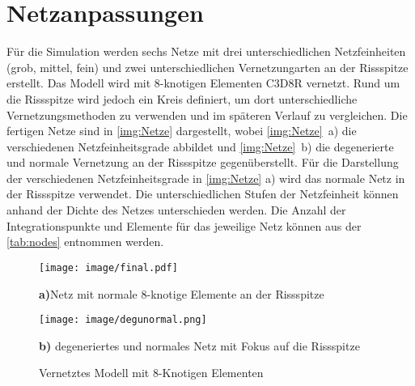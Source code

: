 \section{Netzanpassungen} %

Für die Simulation werden sechs Netze mit drei unterschiedlichen Netzfeinheiten (grob, mittel, fein) und zwei unterschiedlichen Vernetzungarten an der Rissspitze erstellt.  Das Modell wird mit 8-knotigen Elementen \glqq C3D8R\grqq{} vernetzt. Rund um die Rissspitze wird jedoch ein Kreis definiert, um dort unterschiedliche Vernetzungsmethoden zu verwenden und im späteren Verlauf zu vergleichen.  Die fertigen Netze sind in \autoref{img:Netze} dargestellt, wobei \autoref{img:Netze}~a) die verschiedenen Netzfeinheitsgrade abbildet und \autoref{img:Netze}~b) die degenerierte und normale Vernetzung an der Rissspitze gegenüberstellt. Für die Darstellung der verschiedenen Netzfeinheitsgrade in \autoref{img:Netze} a) wird das normale Netz in der Rissspitze verwendet. Die unterschiedlichen Stufen der Netzfeinheit können anhand der Dichte des Netzes unterschieden werden. Die Anzahl der Integrationspunkte und Elemente für das jeweilige Netz können aus der \autoref{tab:nodes} entnommen werden.

\begin{figure}[h]
   \begin{minipage}[b]{.5043\linewidth} %
      \texttt{[image: image/final.pdf]}
      \caption*{\textbf{a)}Netz mit normale 8-knotige Elemente an der Rissspitze}
   \end{minipage}
   \hspace{.01\linewidth}%
   \begin{minipage}[b]{.37\linewidth} %
      \texttt{[image: image/degunormal.png]}
      \caption*{\textbf{b)} degeneriertes und normales Netz mit Fokus auf die Rissspitze}
   \end{minipage}
   \caption{Vernetztes Modell mit 8-Knotigen Elementen}
   \label{img:Netze}
\end{figure}


